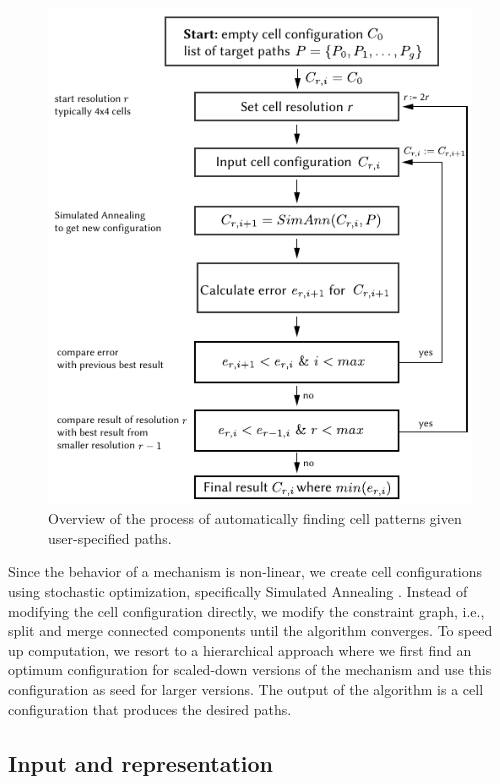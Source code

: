 \begin{figure} [!h]
    \centering
    \includegraphics[width=\textwidth]{chapters/understanding-metamaterial-mechanisms-FIG/13-optimization-overview.pdf}
    \caption[Short figure name.]{Overview of the process of automatically finding cell patterns given user-specified paths.
    \label{fig:13-optimization-overview}}
\end{figure}

Since the behavior of a mechanism is non-linear, we create cell configurations using stochastic optimization, specifically Simulated Annealing \cite{Ram1996, Kirkpatrick1983}. Instead of modifying the cell configuration directly, we modify the constraint graph, i.e., split and merge connected components until the algorithm converges. To speed up computation, we resort to a hierarchical approach where we first find an optimum configuration for scaled-down versions of the mechanism and use this configuration as seed for larger versions. The output of the algorithm is a cell configuration that produces the desired paths.


\subsection{Input and representation}

